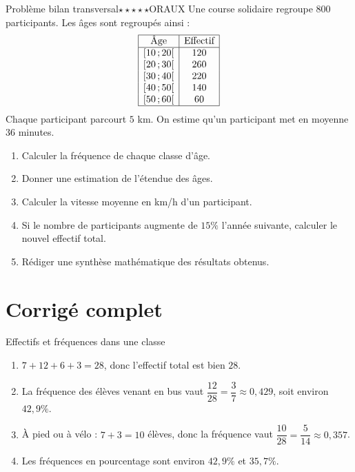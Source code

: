 \documentclass[11pt,a4paper]{article}
\newcommand{\classe}[2]{\ensuremath{[#1\,;#2[}}
\newcounter{exo}
\newcounter{corr}
\begin{document}
\begin{exobox}{Problème bilan transversal}{$\star\star\star\star\star$}{ORAUX}
Une course solidaire regroupe $800$ participants. Les âges sont regroupés ainsi :
\[
\begin{array}{|c|c|}
\hline
\text{Âge} & \text{Effectif} \\
\hline
\classe{10}{20} & 120 \\
\classe{20}{30} & 260 \\
\classe{30}{40} & 220 \\
\classe{40}{50} & 140 \\
\classe{50}{60} & 60 \\
\hline
\end{array}
\]
Chaque participant parcourt $5$ km. On estime qu'un participant met en moyenne $36$ minutes.
\begin{enumerate}
\item Calculer la fréquence de chaque classe d'âge.
\item Donner une estimation de l'étendue des âges.
\item Calculer la vitesse moyenne en km/h d'un participant.
\item Si le nombre de participants augmente de $15\%$ l'année suivante, calculer le nouvel effectif total.
\item Rédiger une synthèse mathématique des résultats obtenus.
\end{enumerate}
\end{exobox}

\newpage
\section{Corrigé complet}
\setcounter{corr}{0}

\begin{corrbox}{Effectifs et fréquences dans une classe}
\begin{enumerate}
\item $7+12+6+3=28$, donc l'effectif total est bien $28$.
\item La fréquence des élèves venant en bus vaut $\dfrac{12}{28}=\dfrac{3}{7}\approx0{,}429$, soit environ $42{,}9\%$.
\item À pied ou à vélo : $7+3=10$ élèves, donc la fréquence vaut $\dfrac{10}{28}=\dfrac{5}{14}\approx0{,}357$.
\item Les fréquences en pourcentage sont environ $42{,}9\%$ et $35{,}7\%$.
\end{enumerate}
\end{corrbox}
\end{document}
